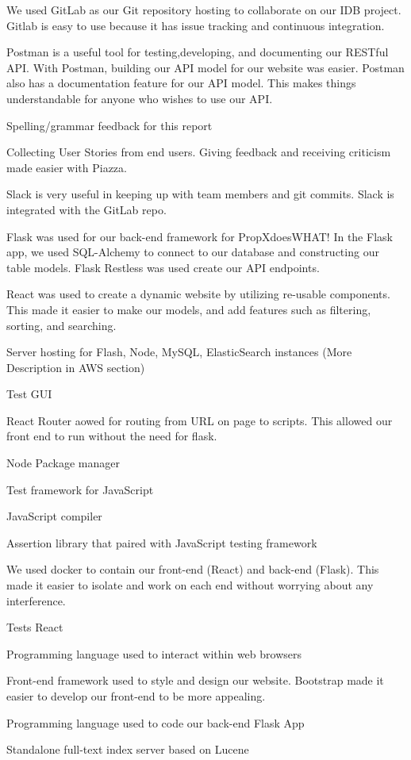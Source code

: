 \documentclass[12pt]{article}
\begin{document}
\begin{description}[font=\bfseries]
	\item[GitLab] We used GitLab as our Git repository hosting to collaborate on our IDB project. Gitlab is easy to use because it has issue tracking and continuous integration.
	\item[Postman] Postman is a useful tool for testing,developing, and documenting our RESTful API. With Postman, building our API model for our website was easier. Postman also has a documentation feature for our API model. This makes things understandable for anyone who wishes to use our API.
	\item[Grammarly] Spelling/grammar feedback for this report
	\item[Piazza] Collecting User Stories from end users. Giving feedback and receiving criticism made easier with Piazza.
	\item[Slack] Slack is very useful in keeping up with team members and git commits. Slack is integrated with the GitLab repo.
	\item[Flask] Flask was used for our back-end framework for PropXdoesWHAT! In the Flask app, we used SQL-Alchemy to connect to our database and constructing our table models. Flask Restless was used create our API endpoints.
	\item[React] React was used to create a dynamic website by utilizing re-usable components. This made it easier to make our models, and add features such as filtering, sorting, and searching.
	\item[AWS] Server hosting for Flash, Node, MySQL, ElasticSearch instances (More Description in AWS section)
	\item[Selenium] Test GUI
	\item[React Router] React Router aowed for routing from URL on page to scripts. This allowed our front end to run without the need for flask.
	\item[npm] Node Package manager
	\item[Mocha] Test framework for JavaScript
	\item[Babel] JavaScript compiler
	\item[Chai] Assertion library that paired with JavaScript testing framework
	\item[Docker] We used docker to contain our front-end (React) and back-end (Flask). This made it easier to isolate and work on each end without worrying about any interference.
	\item[Enzyme] Tests React
	\item[JavaScript] Programming language used to interact within web browsers
	\item[Bootstrap] Front-end framework used to style and design our website. Bootstrap made it easier to develop our front-end to be more appealing. 
	\item[Python] Programming language used to code our back-end Flask App
	\item[ElasticSearch] Standalone full-text index server based on Lucene
\end{description}
\end{document}
